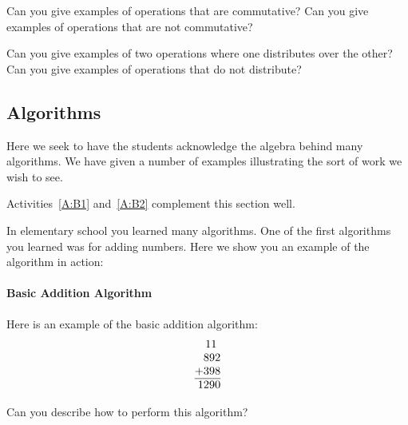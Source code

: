\begin{question}
Can you give examples of operations that are commutative? Can you give
examples of operations that are not commutative?
\end{question}
\QM


\begin{question}
Can you give examples of two operations where one distributes over the
other? Can you give examples of operations that do not distribute?
\end{question}
\QM



\subsection{Algorithms}

\begin{teachingnote}
Here we seek to have the students acknowledge the algebra behind many
algorithms. We have given a number of examples illustrating the sort
of work we wish to see.
\end{teachingnote}


\begin{activitynote}
Activities~\ref{A:B1} and~\ref{A:B2} complement  this section well.  %
\end{activitynote}


In elementary school you learned many algorithms. One of the first
algorithms you learned was for adding numbers. Here we show you an
example of the algorithm in action:




\paragraph{Basic Addition Algorithm}
Here is an example of the basic addition algorithm:
\[
\begin{tabular}{@{}r@{}}
11~~\\
892\\
+398\\ \hline
1290
\end{tabular}
\]

\begin{question}
Can you describe how to perform this algorithm?
\end{question}

